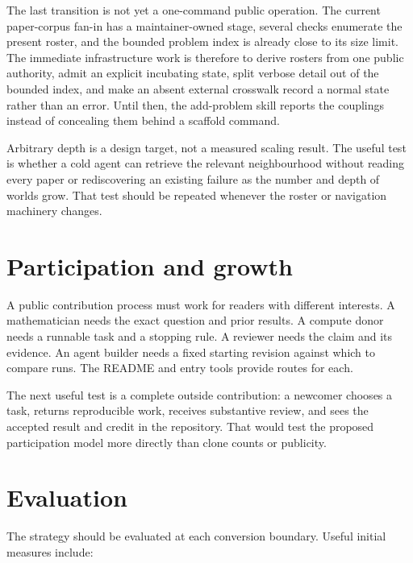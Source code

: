 \documentclass[10pt]{article}
\begin{document}
The last transition is not yet a one-command public operation.  The current
paper-corpus fan-in has a maintainer-owned stage, several checks enumerate the
present roster, and the bounded problem index is already close to its size
limit.  The immediate infrastructure work is therefore to derive rosters from
one public authority, admit an explicit incubating state, split verbose detail
out of the bounded index, and make an absent external crosswalk record a normal
state rather than an error.  Until then, the add-problem skill reports the
couplings instead of concealing them behind a scaffold command.

Arbitrary depth is a design target, not a measured scaling result.  The useful
test is whether a cold agent can retrieve the relevant neighbourhood without
reading every paper or rediscovering an existing failure as the number and
depth of worlds grow.  That test should be repeated whenever the roster or
navigation machinery changes.

\section{Participation and growth}\label{sec:growth}

A public contribution process must work for readers with different interests.
A mathematician needs the exact question and prior results. A compute donor
needs a runnable task and a stopping rule. A reviewer needs the claim and its
evidence. An agent builder needs a fixed starting revision against which to
compare runs. The README and entry tools provide routes for each.

The next useful test is a complete outside contribution: a newcomer chooses a
task, returns reproducible work, receives substantive review, and sees the
accepted result and credit in the repository. That would test the proposed
participation model more directly than clone counts or publicity.

\section{Evaluation}\label{sec:evaluation}

The strategy should be evaluated at each conversion boundary.  Useful initial
measures include:
\end{document}
